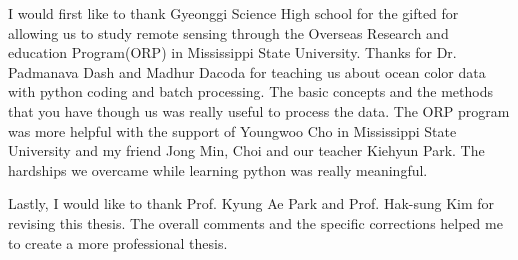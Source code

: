 \begin{acknowledgements}


 I would first like to thank Gyeonggi Science High school for the gifted for allowing us to study remote sensing through the Overseas Research and education Program(ORP) in Mississippi State University. Thanks for Dr. Padmanava Dash and Madhur Dacoda for teaching us about ocean color data with python coding and batch processing. The basic concepts and the methods that you have though us was really useful to process the data. The ORP program was more helpful with the support of Youngwoo Cho in Mississippi State University and my friend Jong Min, Choi and our teacher Kiehyun Park. The hardships we overcame while learning python was really meaningful.
 
 Lastly, I would like to thank Prof. Kyung Ae Park and Prof. Hak-sung Kim for revising this thesis. The overall comments and the specific corrections helped me to create a more professional thesis.  








\end{acknowledgements}

